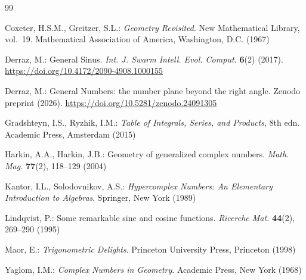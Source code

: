 \documentclass[11pt]{amsart}
\theoremstyle{definition}
\theoremstyle{remark}
\numberwithin{equation}{section}
\begin{document}
\begin{thebibliography}{99}

Coxeter, H.S.M., Greitzer, S.L.: \textit{Geometry Revisited}.
New Mathematical Library, vol.~19. Mathematical Association of America,
Washington, D.C. (1967)

Derraz, M.: General Sinus.
\textit{Int. J. Swarm Intell. Evol. Comput.} \textbf{6}(2) (2017).
\url{https://doi.org/10.4172/2090-4908.1000155}

Derraz, M.: General Numbers: the number plane beyond the right angle.
Zenodo preprint (2026). \url{https://doi.org/10.5281/zenodo.24091305}

Gradshteyn, I.S., Ryzhik, I.M.:
\textit{Table of Integrals, Series, and Products}, 8th edn.
Academic Press, Amsterdam (2015)

Harkin, A.A., Harkin, J.B.: Geometry of generalized complex numbers.
\textit{Math. Mag.} \textbf{77}(2), 118--129 (2004)

Kantor, I.L., Solodovnikov, A.S.:
\textit{Hypercomplex Numbers: An Elementary Introduction to Algebras}.
Springer, New York (1989)

Lindqvist, P.: Some remarkable sine and cosine functions.
\textit{Ricerche Mat.} \textbf{44}(2), 269--290 (1995)

Maor, E.: \textit{Trigonometric Delights}.
Princeton University Press, Princeton (1998)

Yaglom, I.M.: \textit{Complex Numbers in Geometry}.
Academic Press, New York (1968)

\end{thebibliography}
\end{document}

